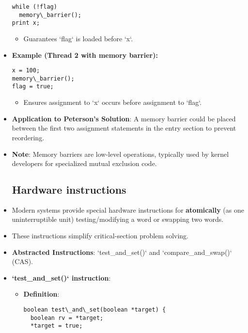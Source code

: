 \begin{itemize}
        \begin{verbatim}
while (!flag)
  memory\_barrier();
print x;
\end{verbatim}
        \begin{itemize}
          \item Guarantees `flag` is loaded before `x`.
        \end{itemize}
  \item \textbf{Example (Thread 2 with memory barrier):}
        \begin{verbatim}
x = 100;
memory\_barrier();
flag = true;
\end{verbatim}
        \begin{itemize}
          \item Ensures assignment to `x` occurs before assignment to `flag`.
        \end{itemize}
  \item \textbf{Application to Peterson's Solution}: A memory barrier could be placed between the first two assignment statements in the entry section to prevent reordering.
  \item \textbf{Note}: Memory barriers are low-level operations, typically used by kernel developers for specialized mutual exclusion code.

        \subsection{Hardware instructions}
  \item Modern systems provide special hardware instructions for \textbf{atomically}
        (as one uninterruptible unit) testing/modifying a word or swapping two words.
  \item These instructions simplify critical-section problem solving.
  \item \textbf{Abstracted Instructions}: `test\_and\_set()` and `compare\_and\_swap()` (CAS).

  \item \textbf{`test\_and\_set()` instruction}:
        \begin{itemize}
          \item \textbf{Definition}:
                \begin{verbatim}
boolean test\_and\_set(boolean *target) {
  boolean rv = *target;
  *target = true;
 

\end{verbatim}
\end{itemize}
\end{itemize}
